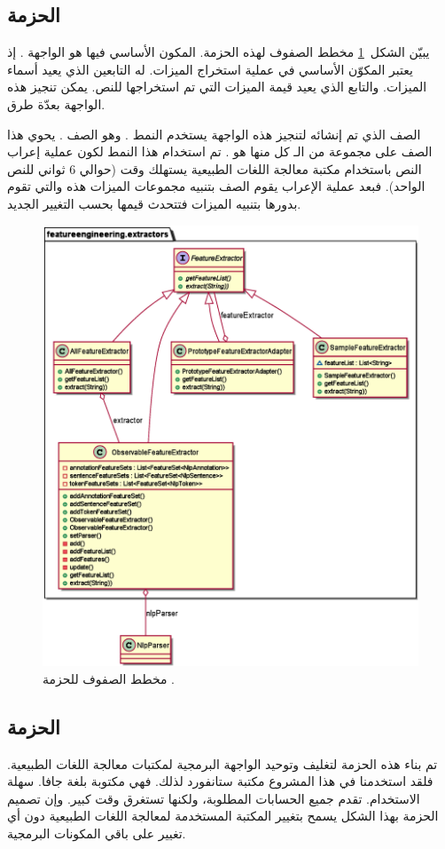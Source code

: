 \subsection{الحزمة }
يبيّن الشكل~\ref{fig:cd:extractors} مخطط الصفوف لهذه الحزمة.
المكون الأساسي فيها هو الواجهة .
إذ يعتبر المكوّن الأساسي في عملية استخراج الميزات.
له التابعين
الذي يعيد أسماء الميزات.
والتابع
الذي يعيد قيمة الميزات التي تم استخراجها للنص.
يمكن تنجيز هذه الواجهة بعدّة طرق.

الصف الذي تم إنشائه لتنجيز هذه الواجهة يستخدم النمط .
وهو الصف .
يحوي هذا الصف على مجموعة من الـ  كل منها هو .
تم استخدام هذا النمط لكون عملية إعراب النص 
باستخدام مكتبة معالجة اللغات الطبيعية يستهلك وقت (حوالي 6 ثواني للنص الواحد).
فبعد عملية الإعراب يقوم الصف بتنبيه مجموعات الميزات هذه والتي تقوم بدورها بتنبيه الميزات فتتحدث قيمها بحسب التغيير الجديد.

\begin{figure}[htb]
	\centering
	\includegraphics[width=0.8\linewidth]{images/cd-extractors.eps}
	\caption{%
		مخطط الصفوف للحزمة .
	}
	\label{fig:cd:extractors}
\end{figure}



\subsection{الحزمة }
تم بناء هذه الحزمة لتغليف وتوحيد الواجهة البرمجية  لمكتبات معالجة اللغات الطبيعية.
فلقد استخدمنا في هذا المشروع مكتبة ستانفورد
لذلك.
فهي مكتوبة بلغة جافا.
سهلة الاستخدام.
تقدم جميع الحسابات المطلوبة،
ولكنها تستغرق وقت كبير.
وإن تصميم الحزمة  بهذا الشكل يسمح بتغيير المكتبة المستخدمة لمعالجة اللغات الطبيعية دون أي تغيير على باقي المكونات البرمجية.

